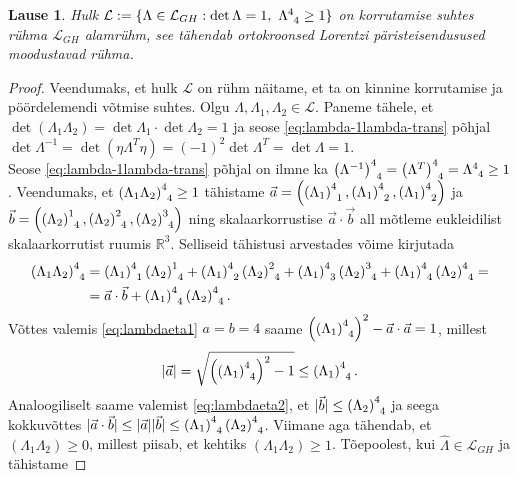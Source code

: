 \documentclass[a4paper,12pt]{article}
\theoremstyle{plain}
\newtheorem{lause}{Lause}[section]
\theoremstyle{definition}
\numberwithin{equation}{section}
\begin{document}
\begin{lause} \label{lause:ryhmL}
Hulk $\mathcal{L} := \{\Lambda \in \mathcal{L}_{GH} : \det \Lambda = 1,\ \Lambda\indices{^4_4} \geq 1\}$ on korrutamise suhtes rühma $\mathcal{L}_{GH}$ alamrühm, see tähendab ortokroonsed Lorentzi päristeisendusused moodustavad rühma.
\end{lause}
\begin{proof}
Veendumaks, et hulk $\mathcal{L}$ on rühm näitame, et ta on kinnine kor\-rutamise ja pöördelemendi võtmise suhtes. Olgu $\Lambda, \Lambda_1, \Lambda_2 \in \mathcal{L}$.
Paneme tähele, et $\det \left(\Lambda_1 \Lambda_2 \right) = \det \Lambda_1 \cdot \det \Lambda_2 = 1$ ja seose \ref{eq:lambda-1lambda-trans} põhjal $\det \Lambda^{-1} = \det \left(\eta \Lambda^T \eta\right) = (-1)^2 \det \Lambda^T = \det \Lambda = 1$. \\
Seose \ref{eq:lambda-1lambda-trans} põhjal on ilmne ka $\left(\Lambda^{-1}\right)\indices{^4_4} = \left(\Lambda^T\right)\indices{^4_4} = \Lambda\indices{^4_4} \geq 1$.
Veendumaks, et $\left(\Lambda_1 \Lambda_2\right)\indices{^4_4} \geq 1$ tähistame $\vec{a} = \left(\left(\Lambda_1\right)\indices{^4_1}, \left(\Lambda_1\right)\indices{^4_2}, \left(\Lambda_1\right)\indices{^4_2}\right)$ 
ja $\vec{b} = \left(\left(\Lambda_2\right)\indices{^1_4}, \left(\Lambda_2\right)\indices{^2_4}, \left(\Lambda_2\right)\indices{^3_4}\right)$ ning skalaarkorrustise $\vec{a} \cdot \vec{b}$ all mõtleme eukleidilist skalaarkorrutist ruumis $\mathbb{R}^3$. Selliseid tähistusi arvestades võime kirjutada
\begin{align*}
\left(\Lambda_1 \Lambda_2\right)\indices{^4_4} &= \left(\Lambda_1\right)\indices{^4_1}\left(\Lambda_2\right)\indices{^1_4} +  \left(\Lambda_1\right)\indices{^4_2}\left(\Lambda_2\right)\indices{^2_4} + \left(\Lambda_1\right)\indices{^4_3}\left(\Lambda_2\right)\indices{^3_4} + \left(\Lambda_1\right)\indices{^4_4}\left(\Lambda_2\right)\indices{^4_4} = \\
&= \vec{a} \cdot \vec{b} + \left(\Lambda_1\right)\indices{^4_4}\left(\Lambda_2\right)\indices{^4_4}.
\end{align*}
Võttes valemis \ref{eq:lambdaeta1} $a = b = 4$ saame $\left(\left(\Lambda_1\right)\indices{^4_4}\right)^2 - \vec{a}\cdot\vec{a} = 1$, millest 
\[|\vec{a}| = \sqrt{\left(\left(\Lambda_1\right)\indices{^4_4}\right)^2 - 1} \leq \left(\Lambda_1\right)\indices{^4_4}.\]
Analoogiliselt saame valemist \ref{eq:lambdaeta2}, et $|\vec{b}| \leq \left(\Lambda_2\right)\indices{^4_4}$ ja seega kokkuvõttes $|\vec{a}\cdot\vec{b}| \leq |\vec{a}||\vec{b}| \leq \left(\Lambda_1\right)\indices{^4_4} \left(\Lambda_2\right)\indices{^4_4}$. Viimane aga tähendab, et $\left(\Lambda_1 \Lambda_2\right) \geq 0$, millest piisab, et kehtiks $\left(\Lambda_1 \Lambda_2\right) \geq 1$. Tõepoolest, kui $\hat{\Lambda} \in \mathcal{L}_{GH}$ ja tähistame 

\end{proof}
\end{document}
